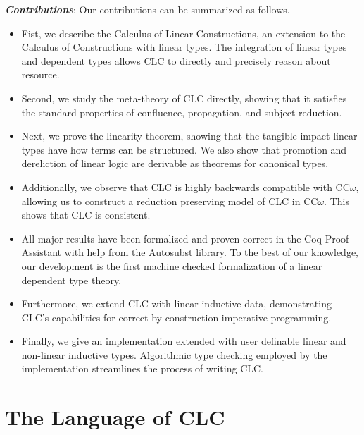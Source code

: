 \documentclass[sigplan,screen,review,authordraft]{acmart}
\theoremstyle{definition}
\begin{document}
  \noindent \textbf{\textit{Contributions}}: 
  Our contributions can be summarized as follows.
  \begin{itemize}
    \item Fist, we describe the Calculus of Linear Constructions, an extension to the Calculus of Constructions with linear types. The integration of linear types and dependent types allows CLC to directly and precisely reason about resource.
    \item Second, we study the meta-theory of CLC directly, showing that it satisfies the standard properties of confluence, propagation, and subject reduction.
    \item Next, we prove the linearity theorem, showing that the tangible impact linear types have how terms can be structured. We also show that promotion and dereliction of linear logic are derivable as theorems for canonical types.
    \item Additionally, we observe that CLC is highly backwards compatible with CC$\omega$, allowing us to construct a reduction preserving model of CLC in CC$\omega$. This shows that CLC is consistent.
    \item All major results have been formalized and proven correct in the Coq Proof Assistant with help from the Autosubst \cite{autosubst} library. To the best of our knowledge, our development is the first machine checked formalization of a linear dependent type theory.
    \item Furthermore, we extend CLC with linear inductive data, demonstrating CLC's capabilities for correct by construction imperative programming.
    \item Finally, we give an implementation extended with user definable linear and non-linear inductive types. Algorithmic type checking employed by the implementation streamlines the process of writing CLC.
  \end{itemize}

  \section{The Language of CLC}
\end{document}
